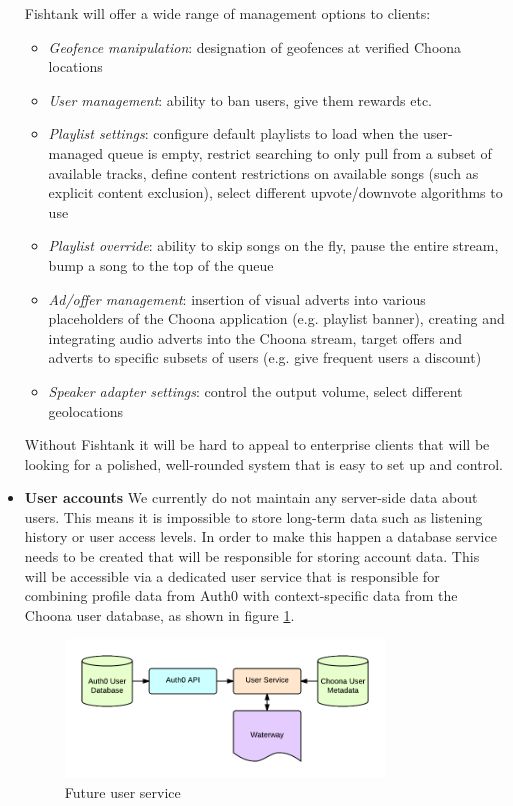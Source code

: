 \begin{itemize}
    Fishtank will offer a wide range of management options to clients:
    \begin{itemize}
      \item \textit{Geofence manipulation}: designation of geofences at verified Choona locations
      \item \textit{User management}: ability to ban users, give them rewards etc.
      \item \textit{Playlist settings}: configure default playlists to load when the user-managed queue is empty, restrict searching to only pull from a subset of available tracks, define content restrictions on available songs (such as explicit content exclusion), select different upvote/downvote algorithms to use
      \item \textit{Playlist override}: ability to skip songs on the fly, pause the entire stream, bump a song to the top of the queue
      \item \textit{Ad/offer management}: insertion of visual adverts into various placeholders of the Choona application (e.g. playlist banner), creating and integrating audio adverts into the Choona stream, target offers and adverts to specific subsets of users (e.g. give frequent users a discount)
      \item \textit{Speaker adapter settings}: control the output volume, select different geolocations
    \end{itemize}

    Without Fishtank it will be hard to appeal to enterprise clients that will be looking for a polished, well-rounded system that is easy to set up and control.

  \item \textbf{User accounts}
    We currently do not maintain any server-side data about users. This means it is impossible to store long-term data such as listening history or user access levels. In order to make this happen a database service needs to be created that will be responsible for storing account data. This will be accessible via a dedicated user service that is responsible for combining profile data from Auth0 with context-specific data from the Choona user database, as shown in figure \ref{fig:user-service}.

    \begin{figure}[h!]
      \centering
      \includegraphics[width=0.8\textwidth]{./img/userservice.png}
      \caption{Future user service}
      \label{fig:user-service}
    \end{figure}


\end{itemize}

